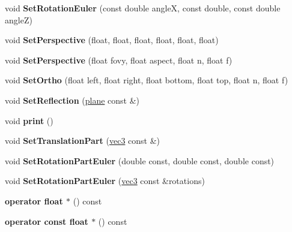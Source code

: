 \begin{DoxyCompactItemize}
\item 
\hypertarget{classmath_1_1mat44_a7bffa57f0e54f22bbd07376b62e97ec9}{
void {\bfseries SetRotationEuler} (const double angleX, const double, const double angleZ)}
\label{classmath_1_1mat44_a7bffa57f0e54f22bbd07376b62e97ec9}

\item 
\hypertarget{classmath_1_1mat44_a0e9cb3e7a8b9a22511e3e4c029878ee6}{
void {\bfseries SetPerspective} (float, float, float, float, float, float)}
\label{classmath_1_1mat44_a0e9cb3e7a8b9a22511e3e4c029878ee6}

\item 
\hypertarget{classmath_1_1mat44_addd3d1b0d2e1352473f125e5e7326053}{
void {\bfseries SetPerspective} (float fovy, float aspect, float n, float f)}
\label{classmath_1_1mat44_addd3d1b0d2e1352473f125e5e7326053}

\item 
\hypertarget{classmath_1_1mat44_ad10cf706b6e72a2198954840133037c2}{
void {\bfseries SetOrtho} (float left, float right, float bottom, float top, float n, float f)}
\label{classmath_1_1mat44_ad10cf706b6e72a2198954840133037c2}

\item 
\hypertarget{classmath_1_1mat44_a9cf6eaa4cc2b636c0207a30d961d27a1}{
void {\bfseries SetReflection} (\hyperlink{classmath_1_1plane}{plane} const \&)}
\label{classmath_1_1mat44_a9cf6eaa4cc2b636c0207a30d961d27a1}

\item 
\hypertarget{classmath_1_1mat44_a8da9b72cb6a80f1630e924b7ba95bcbc}{
void {\bfseries print} ()}
\label{classmath_1_1mat44_a8da9b72cb6a80f1630e924b7ba95bcbc}

\item 
\hypertarget{classmath_1_1mat44_adbcc30f023edd4169b1a880c059750d0}{
void {\bfseries SetTranslationPart} (\hyperlink{classmath_1_1vec3}{vec3} const \&)}
\label{classmath_1_1mat44_adbcc30f023edd4169b1a880c059750d0}

\item 
\hypertarget{classmath_1_1mat44_abf0a0f6af3a5472879a54886987a4fcb}{
void {\bfseries SetRotationPartEuler} (double const, double const, double const)}
\label{classmath_1_1mat44_abf0a0f6af3a5472879a54886987a4fcb}

\item 
\hypertarget{classmath_1_1mat44_ab80119a851b0a4c03a5d4f905eec64f9}{
void {\bfseries SetRotationPartEuler} (\hyperlink{classmath_1_1vec3}{vec3} const \&rotations)}
\label{classmath_1_1mat44_ab80119a851b0a4c03a5d4f905eec64f9}

\item 
\hypertarget{classmath_1_1mat44_a1c617ef35be76f8b6f3c02fab7ed5a52}{
{\bfseries operator float $\ast$} () const }
\label{classmath_1_1mat44_a1c617ef35be76f8b6f3c02fab7ed5a52}

\item 
\hypertarget{classmath_1_1mat44_a478846c97fc9b4906ce566ae2dd38d69}{
{\bfseries operator const float $\ast$} () const }
\label{classmath_1_1mat44_a478846c97fc9b4906ce566ae2dd38d69}

\end{DoxyCompactItemize}
